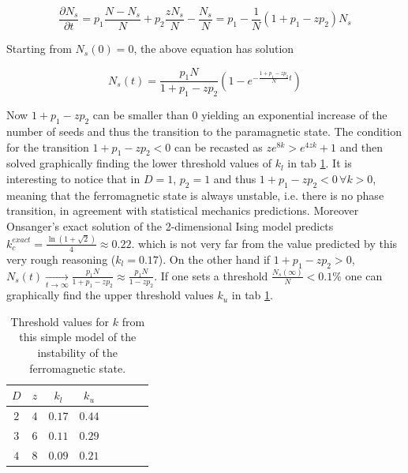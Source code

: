 \documentclass[a4paper, 11pt]{article}
\begin{document}
      \begin{equation}
        \frac{\partial N_{s}}{\partial t} = p_1\frac{N - N_{s}}{N}  + p_2 \frac{zN_s}{N}- \frac{N_{s}}{N} = p_1 - \frac{1}{N}(1 + p_1 - zp_2) N_s
      \end{equation}

      Starting from $N_s(0) = 0$, the above equation has solution

      \begin{equation}
        N_{s}(t) = \frac{p_1N}{1 + p_1 - zp_2}\left(1 - e^{-\frac{1 + p_1 -zp_2}{N}t}  \right)
      \end{equation}

      Now $1 + p_1 - zp_2$ can be smaller than 0 yielding an exponential increase of the number of seeds and thus the transition to the paramagnetic state. The condition for the transition $1 + p_1 - zp_2 < 0$ can be recasted as $ze^{8k} > e^{4zk} + 1$ and then solved graphically finding the lower threshold values of $k_l$ in tab \ref{tab:k_crit_th}.
      It is interesting to notice that in $D = 1$, $p_2 = 1$ and thus $1 + p_1 - zp_2 < 0 \, \forall k > 0$, meaning that the ferromagnetic state is always unstable, i.e. there is no phase transition, in agreement with statistical mechanics predictions. Moreover Onsanger's exact solution of the 2-dimensional Ising model predicts $k_{c}^{exact} = \frac{\ln(1 + \sqrt{2})}{4} \approx 0.22$. which is not very far from the value predicted by this very rough reasoning ($k_l = 0.17$).
      On the other hand if $1 + p_1 - zp_2 > 0$, $N_s(t) \xrightarrow[t \to \infty]{} \frac{p_1N}{1 + p_1 - zp_2} \approx \frac{p_1N}{1 - zp_2}$.
      If one sets a threshold $\frac{N_s(\infty)}{N} < 0.1\%$ one can graphically find the upper threshold values $k_u$ in tab \ref{tab:k_crit_th}.

      \begin{table}[H]
        \centering
        \begin{tabular}{cccccccc}
          \toprule
          $D$ & $z$ & $k_l$ & $k_u$ \\
          \midrule
          $2$ & $4$ & $0.17$ & $0.44$ \\
          $3$ & $6$ & $0.11$ & $0.29$ \\
          $4$ & $8$ & $0.09$ & $0.21$ \\
          \bottomrule
        \end{tabular}
        \caption{Threshold values for $k$ from this simple model of the instability of the ferromagnetic state.}
        \label{tab:k_crit_th}
      \end{table}
\end{document}
